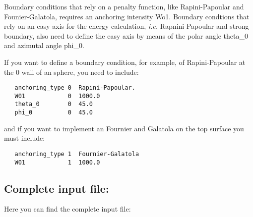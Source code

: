 \documentclass{article}
\begin{document}
Boundary conditions that rely on a penalty function, like
  Rapini-Papoular and Founier-Galatola, requires an anchoring
intensity Wo1. Boundary condtions that rely on an easy axis for the
energy calculation, \textit{i.e.} Rapnini-Papoular and
  strong boundary, also need to define the easy axis by means of the
polar angle theta_0 and azimutal angle phi_0.

If you want to define a boundary condition, for example, of
Rapini-Papoular at the 0 wall of an sphere, you need to include:
\begin{lstlisting}
   anchoring_type 0  Rapini-Papoular.
   W01            0  1000.0
   theta_0        0  45.0
   phi_0          0  45.0	
\end{lstlisting}
and if you want to implement an Fournier and Galatola on the top
surface you must include:

\begin{lstlisting}
   anchoring_type 1  Fournier-Galatola
   W01            1  1000.0
\end{lstlisting}


\subsection{Complete input file:}

Here you can find the complete input file:
\end{document}
